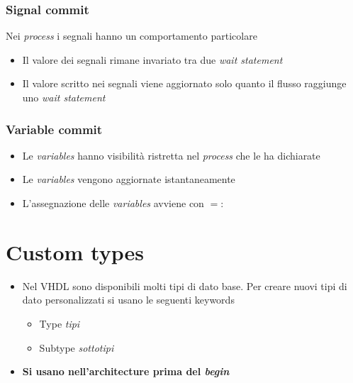 \documentclass{article}
\begin{document}
\subsubsection{Signal commit}
Nei \textit{process} i segnali hanno un comportamento particolare
\begin{itemize}
	\item Il valore dei segnali rimane invariato tra due \textit{wait statement}
	\item Il valore scritto nei segnali viene aggiornato solo quanto il flusso raggiunge uno \textit{wait statement}
\end{itemize}
\subsubsection{Variable commit}
\begin{itemize}
	\item Le \textit{variables} hanno visibilità ristretta nel \textit{process} che le ha dichiarate
	\item Le \textit{variables} vengono aggiornate istantaneamente
	\item L'assegnazione delle \textit{variables} avviene con \(=:\)
\end{itemize}

\newpage

\section{Custom types}
\begin{itemize}
	\item Nel VHDL sono disponibili molti tipi di dato base. Per creare nuovi tipi di dato personalizzati si usano le seguenti keywords
	      \begin{itemize}
	      	\item Type \textit{tipi}
	      	\item Subtype \textit{sottotipi}
	      \end{itemize}
	\item \textbf{Si usano nell'architecture prima del \textit{begin}}
\end{itemize}
\end{document}
